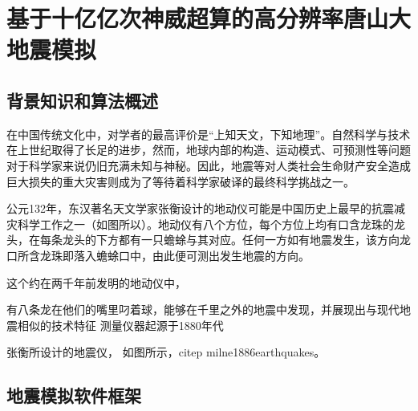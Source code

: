 \chapter{基于十亿亿次神威超算的高分辨率唐山大地震模拟}
\label{chap:earthquake}

\section{背景知识和算法概述}

在中国传统文化中，对学者的最高评价是“上知天文，下知地理”。自然科学与技术在上世纪取得了长足的进步，然而，地球内部的构造、运动模式、可预测性等问题对于科学家来说仍旧充满未知与神秘。因此，地震等对人类社会生命财产安全造成巨大损失的重大灾害则成为了等待着科学家破译的最终科学挑战之一。

公元132年，东汉著名天文学家张衡设计的地动仪可能是中国历史上最早的抗震减灾科学工作之一（如图所以）。地动仪有八个方位，每个方位上均有口含龙珠的龙头，在每条龙头的下方都有一只蟾蜍与其对应。任何一方如有地震发生，该方向龙口所含龙珠即落入蟾蜍口中，由此便可测出发生地震的方向\cite{}。

这个约在两千年前发明的地动仪中，


有八条龙在他们的嘴里叼着球，能够在千里之外的地震中发现，并展现出与现代地震相似的技术特征 测量仪器起源于1880年代

张衡所设计的地震仪， 如图所示，citep {milne1886earthquakes}。

\section{地震模拟软件框架}

